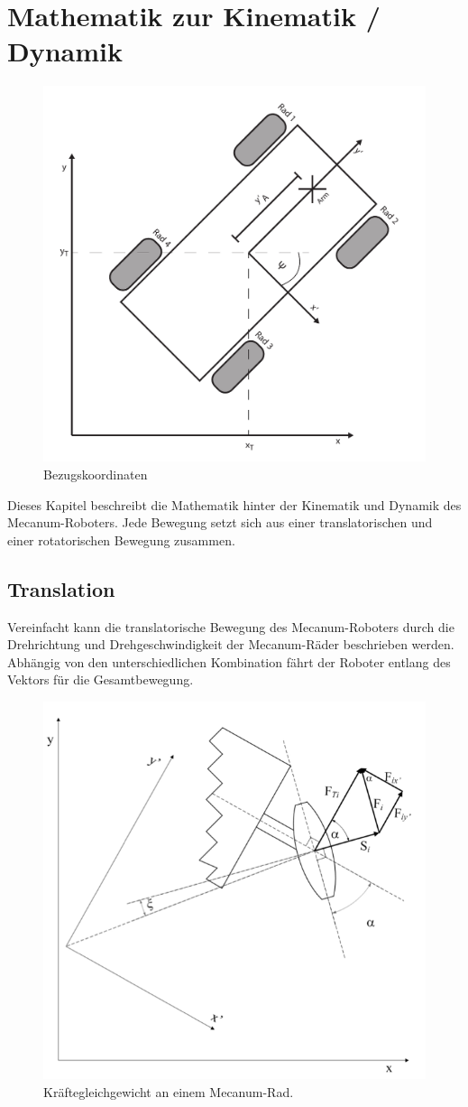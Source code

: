\section{Mathematik zur Kinematik / Dynamik}
\begin{figure}
    \centering
    \includegraphics[width=.8\textwidth]{Abbildungen/Koordinaten}
    \caption{Bezugskoordinaten}
\end{figure}
Dieses Kapitel beschreibt die Mathematik hinter der Kinematik und Dynamik des Mecanum-Roboters.
Jede Bewegung setzt sich aus einer translatorischen und einer rotatorischen Bewegung zusammen.

\subsection{Translation}
Vereinfacht kann die translatorische Bewegung des Mecanum-Roboters durch die Drehrichtung und Drehgeschwindigkeit der Mecanum-Räder beschrieben werden. Abhängig von den unterschiedlichen Kombination fährt der Roboter entlang des Vektors für die Gesamtbewegung.
\begin{figure}[H]
    \centering
    \includegraphics[width=.6\textwidth]{Abbildungen/Kraefte-am-Rad}
    \caption{Kräftegleichgewicht an einem Mecanum-Rad.}
\end{figure}

